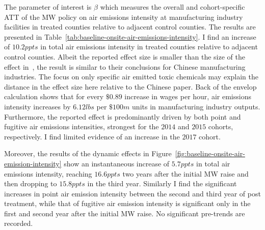 \documentclass[12pt, english]{article}
\begin{document}
    The parameter of interest is $\beta$ which measures the overall and cohort-specific ATT of the MW policy on air emissions intensity at manufacturing industry facilities in treated counties relative to adjacent control counties. The results are presented in Table~\ref{tab:baseline-onsite-air-emissions-intensity}. I find an increase of $10.2ppts$ in total air emissions intensity in treated counties relative to adjacent control counties. Albeit the reported effect size is smaller than the size of the effect in~\cite{zhang2023unintended}, the result is similar to their conclusions for Chinese manufacturing industries. The focus on only specific air emitted toxic chemicals may explain the distance in the effect size here relative to the Chinese paper. Back of the envelop calculation shows that for every $\$0.89$ increase in wages per hour, air emissions intensity increases by $6.12lbs$ per $\$100m$ units in manufacturing industry outputs. Furthermore, the reported effect is predominantly driven by both point and fugitive air emissions intensities, strongest for the $2014$ and $2015$ cohorts, respectively. I find limited evidence of an increase in the $2017$ cohort.

    Moreover, the results of the dynamic effects in Figure~\ref{fig:baseline-onsite-air-emission-intensity} show an instantaneous increase of $5.7ppts$ in total air emissions intensity, reaching $16.6ppts$ two years after the initial MW raise and then dropping to $15.8ppts$ in the third year. Similarly I find the significant increases in point air emission intensity between the second and third year of post treatment, while that of fugitive air emission intensity is significant only in the first and second year after the initial MW raise. No significant pre-trends are recorded.
    
\end{document}

